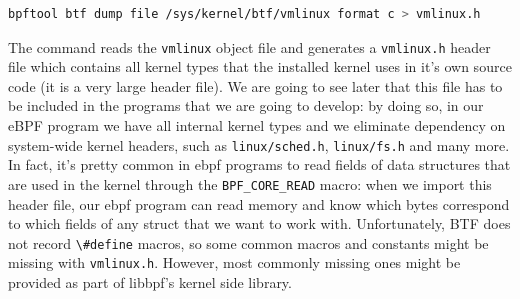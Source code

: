 \begin{lstlisting}[style=commandline, language=bash, caption={\colorbox{backcolour}{\lstinline[style=commandline, language=bash]|vmlinux.h|} generation command.}]
	bpftool btf dump file /sys/kernel/btf/vmlinux format c > vmlinux.h
\end{lstlisting}

The command reads the \colorbox{backcolour}{\lstinline[style=commandline, language=bash, breaklines=true]|vmlinux|} object file and generates a \colorbox{backcolour}{\lstinline[style=commandline, language=bash, breaklines=true]|vmlinux.h|} header file which contains all kernel types that the installed kernel uses in it’s own source code (it is a very large header file). 
We are going to see later that this file has to be included in the programs that we are going to develop: by doing so, in our eBPF program we have all internal kernel types and we eliminate dependency on system-wide kernel headers, such as \colorbox{backcolour}{\lstinline[style=commandline, language=bash, breaklines=true]|linux/sched.h|}, \colorbox{backcolour}{\lstinline[style=commandline, language=bash, breaklines=true]|linux/fs.h|} and many more.
In fact, it’s pretty common in ebpf programs to read fields of data structures that are used in the kernel through the \colorbox{backcolour}{\lstinline[style=commandline, language=bash, breaklines=true]|BPF_CORE_READ|} macro: when we import this header file, our ebpf program can read memory and know which bytes correspond to which fields of any struct that we want to work with.
Unfortunately, BTF does not record \colorbox{backcolour}{\lstinline[style=commandline, language=bash, breaklines=true]|\#define|} macros, so some common macros and constants might be missing with \colorbox{backcolour}{\lstinline[style=commandline, language=bash, breaklines=true]|vmlinux.h|}. 
However, most commonly missing ones might be provided as part of libbpf’s kernel side library.

